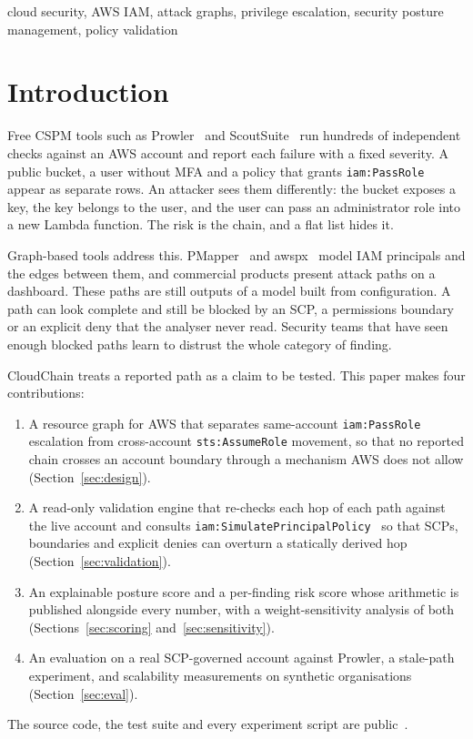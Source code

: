 \documentclass[conference]{IEEEtran}
\begin{document}
\begin{IEEEkeywords}
cloud security, AWS IAM, attack graphs, privilege escalation, security posture management, policy validation
\end{IEEEkeywords}

\section{Introduction}

Free CSPM tools such as Prowler~\cite{prowler} and ScoutSuite~\cite{scoutsuite} run hundreds of independent checks against an AWS account and report each failure with a fixed severity. A public bucket, a user without MFA and a policy that grants \texttt{iam:PassRole} appear as separate rows. An attacker sees them differently: the bucket exposes a key, the key belongs to the user, and the user can pass an administrator role into a new Lambda function. The risk is the chain, and a flat list hides it.

Graph-based tools address this. PMapper~\cite{pmapper} and awspx~\cite{awspx} model IAM principals and the edges between them, and commercial products present attack paths on a dashboard. These paths are still outputs of a model built from configuration. A path can look complete and still be blocked by an SCP, a permissions boundary or an explicit deny that the analyser never read. Security teams that have seen enough blocked paths learn to distrust the whole category of finding.

CloudChain treats a reported path as a claim to be tested. This paper makes four contributions:
\begin{enumerate}
\item A resource graph for AWS that separates same-account \texttt{iam:PassRole} escalation from cross-account \texttt{sts:AssumeRole} movement, so that no reported chain crosses an account boundary through a mechanism AWS does not allow (Section~\ref{sec:design}).
\item A read-only validation engine that re-checks each hop of each path against the live account and consults \texttt{iam:SimulatePrincipalPolicy}~\cite{awssim} so that SCPs, boundaries and explicit denies can overturn a statically derived hop (Section~\ref{sec:validation}).
\item An explainable posture score and a per-finding risk score whose arithmetic is published alongside every number, with a weight-sensitivity analysis of both (Sections~\ref{sec:scoring} and~\ref{sec:sensitivity}).
\item An evaluation on a real SCP-governed account against Prowler, a stale-path experiment, and scalability measurements on synthetic organisations (Section~\ref{sec:eval}).
\end{enumerate}
The source code, the test suite and every experiment script are public~\cite{cloudchain}.
\end{document}
